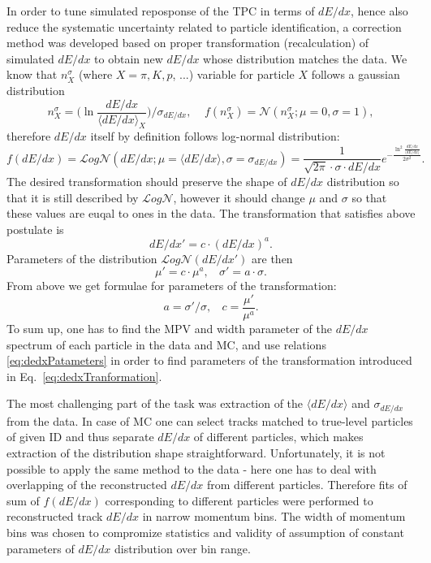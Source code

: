 In order to tune simulated reposponse of the TPC in terms of $dE/dx$, hence also reduce the systematic uncertainty related to particle identification, a correction method was developed based on proper transformation (recalculation) of simulated $dE/dx$ to obtain new $dE/dx$ whose distribution matches the data.
We know that $n^{\sigma}_{X}$ (where $X=\pi, K, p$, ...) variable for particle $X$ follows a gaussian distribution
\begin{equation}n^{\sigma}_{X} = \Big( \ln{\frac{dE/dx}{\langle dE/dx\rangle_{X}}} \Big) / \sigma_{dE/dx},~~~~~f(n^{\sigma}_{X}) = \mathcal{N}(n^{\sigma}_{X}; \mu=0,\sigma=1),\end{equation}
therefore $dE/dx$ itself by definition follows log-normal distribution:
\begin{equation}f(dE/dx) = \mathcal{L}og\mathcal{N}(dE/dx; \mu=\langle dE/dx\rangle,\sigma=\sigma_{dE/dx}) = \frac{1}{\sqrt{2\pi}\cdot \sigma\cdot dE/dx}e^{-\frac{\ln^{2}{\frac{dE/dx}{\langle dE/dx\rangle}}}{2\sigma^{2}}}.\end{equation}
The desired transformation should preserve the shape of $dE/dx$ distribution so that it is still described by $\mathcal{L}og\mathcal{N}$, however it should change $\mu$ and $\sigma$ so that these values are euqal to ones in the data. The transformation that satisfies above postulate is
\begin{equation}dE/dx' = c\cdot (dE/dx)^{a}.\label{eq:dedxTranformation}\end{equation}
Parameters of the distribution $\mathcal{L}og\mathcal{N}(dE/dx')$ are then
\begin{equation}\mu' = c\cdot\mu^{a},~~~~\sigma' = a\cdot\sigma.\end{equation}
From above we get formulae for parameters of the transformation:
\begin{equation}a=\sigma'/\sigma,~~~~c = \frac{\mu'}{\mu^{a}}.\label{eq:dedxPatameters}\end{equation}%
%
To sum up, one has to find the MPV and width parameter of the $dE/dx$ spectrum of each particle in the data and MC, and use relations \eqref{eq:dedxPatameters} in order to find parameters of the transformation introduced in Eq.~\eqref{eq:dedxTranformation}.

The most challenging part of the task was extraction of the $\langle dE/dx\rangle$ and $\sigma_{dE/dx}$ from the data. In case of MC one can select tracks matched to true-level particles of given ID and thus separate $dE/dx$ of different particles, which makes extraction of the distribution shape straightforward. Unfortunately, it is not possible to apply the same method to the data - here one has to deal with overlapping of the reconstructed $dE/dx$ from different particles. Therefore fits of sum of $f(dE/dx)$ corresponding to different particles were performed to reconstructed track $dE/dx$ in narrow momentum bins. The width of momentum bins was chosen to compromize statistics and validity of assumption of constant parameters of $dE/dx$ distribution over bin range.


